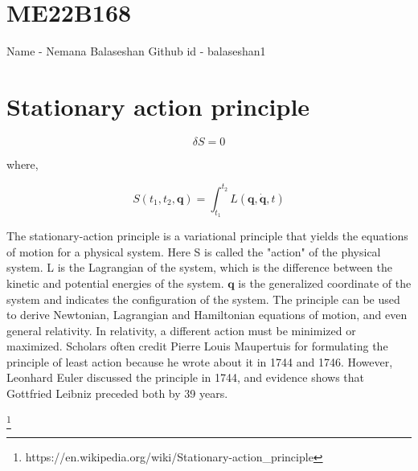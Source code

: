 \section{ME22B168}
Name - Nemana Balaseshan
Github id - balaseshan1

\section{Stationary action principle}

\begin{equation}
    \delta S = 0
\end{equation}

where,

\begin{equation}
    S(t_1, t_2, \mathbf{q}) = \int_{t_1}^{t_2}{L(\mathbf{q}, \mathbf{\dot{q}}, t)}
\end{equation}

The stationary-action principle is a variational principle that yields the equations of motion for a physical system. Here S is called the "action" of the physical system. L is the Lagrangian of the system, which is the difference between the kinetic and potential energies of the system. $\mathbf{q}$ is the generalized coordinate of the system and indicates the configuration of the system. The principle can be used to derive Newtonian, Lagrangian and Hamiltonian equations of motion, and even general relativity. In relativity, a different action must be minimized or maximized. Scholars often credit Pierre Louis Maupertuis for formulating the principle of least action because he wrote about it in 1744 and 1746. However, Leonhard Euler discussed the principle in 1744, and evidence shows that Gottfried Leibniz preceded both by 39 years.

\footnote{https://en.wikipedia.org/wiki/Stationary-action\_principle}
